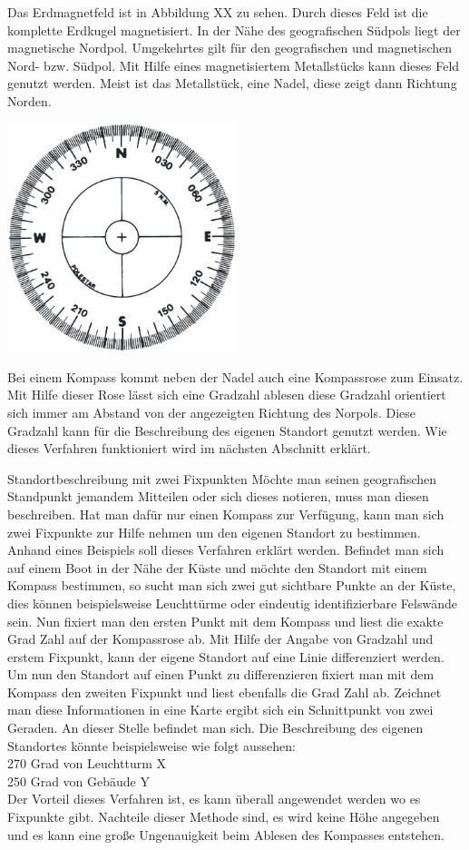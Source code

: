 Das Erdmagnetfeld ist in Abbildung XX zu sehen. Durch dieses Feld ist die komplette Erdkugel magnetisiert. In der Nähe des geografischen Südpols liegt der magnetische Nordpol. Umgekehrtes gilt für den geografischen und magnetischen Nord- bzw. Südpol.
Mit Hilfe eines magnetisiertem Metallstücks kann dieses Feld genutzt werden. Meist ist das Metallstück, eine Nadel,  diese zeigt dann Richtung Norden.

\includegraphics[width=0.50\textwidth]{ref/images/kompassrose.jpg}
 
Bei einem Kompass kommt neben der Nadel auch eine Kompassrose zum Einsatz. Mit Hilfe dieser Rose lässt sich eine Gradzahl ablesen diese Gradzahl orientiert sich immer am Abstand von der angezeigten Richtung des Norpols. Diese Gradzahl kann für die Beschreibung des eigenen Standort genutzt werden. Wie dieses Verfahren funktioniert wird im nächsten Abschnitt erklärt.

Standortbeschreibung mit zwei Fixpunkten
Möchte man seinen geografischen Standpunkt jemandem Mitteilen oder sich dieses notieren, muss man diesen beschreiben. Hat man dafür nur einen Kompass zur Verfügung, kann man sich zwei Fixpunkte zur Hilfe nehmen um den eigenen Standort zu bestimmen.
Anhand eines Beispiels soll dieses Verfahren erklärt werden. Befindet man sich auf einem Boot in der Nähe der Küste und möchte den Standort mit einem Kompass bestimmen, so sucht man sich zwei gut sichtbare Punkte an der Küste, dies können beispielsweise Leuchttürme oder eindeutig identifizierbare Felswände sein. Nun fixiert man den ersten Punkt mit dem Kompass und liest die exakte Grad Zahl auf der Kompassrose ab. Mit Hilfe der Angabe von Gradzahl und erstem Fixpunkt, kann der eigene Standort auf eine Linie differenziert werden. Um nun den Standort auf einen Punkt zu differenzieren fixiert man mit dem Kompass den zweiten Fixpunkt und liest ebenfalls die Grad Zahl ab. Zeichnet man diese Informationen in eine Karte ergibt sich ein Schnittpunkt von zwei Geraden. An dieser Stelle befindet man sich. Die Beschreibung des eigenen Standortes könnte beispielsweise wie folgt aussehen:
\\270 Grad von Leuchtturm X
\\250 Grad von Gebäude Y
\\Der Vorteil dieses Verfahren ist, es kann überall angewendet werden wo es Fixpunkte gibt.
Nachteile dieser Methode sind, es wird keine Höhe angegeben und es kann eine große Ungenauigkeit beim Ablesen des Kompasses entstehen.

